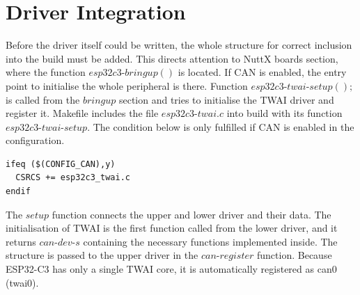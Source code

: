 \documentclass{ctuthesis}
\begin{document}
 \section{Driver Integration}
 Before the driver itself could be written, the whole structure for correct inclusion into the build must be added. This directs attention to NuttX boards section, where  the function $esp32c3\text{-}bringup()$ is located. If CAN is enabled, the entry point to initialise the whole peripheral is there. Function $esp32c3\text{-}twai\text{-}setup();$ is called from the $bring up$ section and tries to initialise the TWAI driver and register it. Makefile includes the file $esp32c3\text{-}twai.c$ into build with its function $esp32c3\text{-}twai\text{-}setup$. The condition below is only fulfilled if CAN is enabled in the configuration.
\begin{verbatim}
ifeq ($(CONFIG_CAN),y)
  CSRCS += esp32c3_twai.c
endif
\end{verbatim}
 The $setup$ function connects the upper and lower driver and their data. The initialisation of TWAI is the first function called from the lower driver, and it returns $can\text{-}dev\text{-}s$ containing the necessary functions implemented inside. The structure is passed to the upper driver in the $can\text{-}register$ function. Because ESP32-C3 has only a single TWAI core, it is automatically registered as can0 (twai0).
\end{document}
